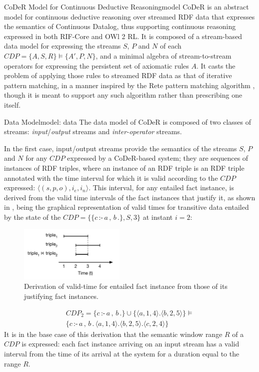 \begin{nestedsection}{CoDeR Model for Continuous Deductive Reasoning}{model}
	CoDeR is an abstract model for continuous deductive reasoning over streamed RDF data that expresses the semantics of Continuous Datalog, thus supporting continuous reasoning expressed in both RIF-Core and OWl 2 RL.
	It is composed of a stream-based data model for expressing the streams $S$, $P$ and $N$ of each ${CDP = \{A,S,R\} \vDash \{A',P,N\}}$, and a minimal algebra of stream-to-stream operators for expressing the persistent set of axiomatic rules $A$.
	It casts the problem of applying those rules to streamed RDF data as that of iterative pattern matching, in a manner inspired by the Rete pattern matching algorithm \citep{forgy79}, though it is meant to support any such algorithm rather than prescribing one itself.

	\begin{nestedsection}{Data Model}{model: data}
		The data model of CoDeR is composed of two classes of streams: \emph{input}/\emph{output} streams and \emph{inter-operator} streams.

		In the first case, input/output streams provide the semantics of the streams $S$, $P$ and $N$ for any ${CDP}$ expressed by a CoDeR-based system;
		they are sequences of instances of RDF triples, where an instance of an RDF triple is an RDF triple annotated with the time interval for which it is valid \citep{SemanticStreamingManagement,sparkwave} according to the ${CDP}$ expressed: ${\langle (s,p,o),i_{e},i_{n} \rangle}$.
		This interval, for any entailed fact instance, is derived from the valid time intervals of the fact instances that justify it, as shown in , being the graphical representation of valid times for transitive data entailed by the state of the ${CDP = \{\{c\,\text{:-}\,a\,,\,b\,.\},S,3\}}$ at instant ${i = 2}$:
		\begin{figure}[t]
			\centering
			\includegraphics[width=0.45\textwidth]{intersected-intervals}
			\caption{Derivation of valid-time for entailed fact instance from those of its justifying fact instances.}
		\end{figure}
		\begin{multline*}
			CDP_{2} = \{c\,\text{:-}\,a\,,\,b\,.\} \cup \{ \langle a,1,4 \rangle . \langle b,2,5 \rangle \} \vDash \\
			\{ c\,\text{:-}\,a\,,\,b\,.\,\langle a,1,4 \rangle . \langle b,2,5 \rangle . \langle c,2,4 \rangle \}
		\end{multline*}
		It is in the base case of this derivation that the semantic window range $R$ of a ${CDP}$ is expressed:
		each fact instance arriving on an input stream has a valid interval from the time of its arrival at the system for a duration equal to the range $R$.


\end{nestedsection}
\end{nestedsection}
